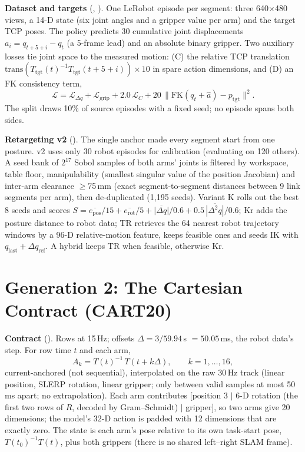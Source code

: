 \documentclass[conference,10pt]{IEEEtran}
\newcommand{\mm}{\,mm\xspace}
\begin{document}
\textbf{Dataset and targets} (, ). One LeRobot episode per segment: three
640$\times$480 views, a 14-D state (six joint angles and a gripper value per arm) and the target TCP poses. The policy predicts 30
cumulative joint displacements $a_i=q_{t+5+i}-q_t$ (a 5-frame lead) and an absolute binary gripper. Two auxiliary losses tie joint
space to the measured motion: (C) the relative TCP translation $\mathrm{trans}(T_\text{tgt}(t)^{-1}T_\text{tgt}(t{+}5{+}i))\times10$
in spare action dimensions, and (D) an FK consistency term,
\begin{equation}
\mathcal{L}=\mathcal{L}_{\Delta q}+\mathcal{L}_\text{grip}+2.0\,\mathcal{L}_C+20\,\lVert \mathrm{FK}(q_t+\hat a)-p_\text{tgt}\rVert^2 .
\end{equation}
The split draws 10\% of source episodes with a fixed seed; no episode spans both sides.

\textbf{Retargeting v2} (). The single anchor made every segment start from one posture. v2 uses only
30 robot episodes for calibration (evaluating on 120 others). A seed bank of $2^{17}$ Sobol samples of both arms' joints is filtered
by workspace, table floor, manipulability (smallest singular value of the position Jacobian) and inter-arm clearance $\ge$75\mm{}
(exact segment-to-segment distances between 9 link segments per arm), then de-duplicated (1{,}195 seeds). Variant K rolls out the
best 8 seeds and scores $S=\overline{e_\text{pos}}/15+\overline{e_\text{rot}}/5+\overline{|\Delta q|}/0.6+0.5\,\overline{|\Delta^2q|}/0.6$;
Kr adds the posture distance to robot data; TR retrieves the 64 nearest robot trajectory windows by a 96-D relative-motion
feature, keeps feasible ones and seeds IK with $q_\text{last}+\Delta q_\text{ref}$. A hybrid keeps TR when feasible, otherwise Kr.

\section{Generation 2: The Cartesian Contract (CART20)}\label{m:sec:gen2}
\textbf{Contract} (). Rows at 15\,Hz; offsets $\Delta=3/59.94$\,s $=50.05$\,ms, the robot data's
step. For row time $t$ and each arm,
\begin{equation}
A_k = T(t)^{-1}\,T(t+k\Delta),\qquad k=1,\dots,16 ,
\end{equation}
current-anchored (not sequential), interpolated on the raw 30\,Hz track (linear position, SLERP rotation, linear gripper; only
between valid samples at most 50\,ms apart; no extrapolation). Each arm contributes [position 3 $\mid$ 6-D rotation (the first two
rows of $R$, decoded by Gram--Schmidt) $\mid$ gripper], so two arms give 20 dimensions; the model's 32-D action is padded with 12
dimensions that are exactly zero. The state is each arm's pose relative to its own task-start pose, $T(t_0)^{-1}T(t)$, plus both
grippers (there is no shared left--right SLAM frame).
\end{document}
